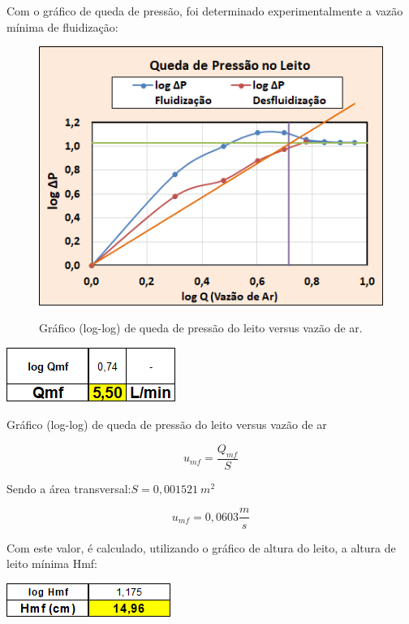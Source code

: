 Com o gráfico de queda de pressão, foi determinado experimentalmente a vazão mínima de fluidização:


\begin{figure}[H]
	\begin{center}
		\includegraphics[scale=1, trim={0 0 0 0}]{figuras/ladeq/fluid/graph3}
		\label{fig7}
		\caption{Gráfico (log-log) de queda de pressão do leito versus vazão de ar.}
	\end{center}
\end{figure}

\includegraphics[scale=.8, trim={0 0 0 0}]{figuras/ladeq/fluid/table1}

Gráfico (log-log) de queda de pressão do leito versus vazão de ar

\begin{equation}\label{key}
u_{m f}=\frac{Q_{m f}}{S}
\end{equation}


Sendo a área transversal:$  S=0,001521 \ m^2 $


\begin{equation}\label{key}
u_{m f}=0,0603 \frac{m}{s}
\end{equation}


Com este valor, é calculado, utilizando o gráfico de altura do leito, a altura de leito mínima Hmf:

\includegraphics[scale=.8, trim={0 0 0 0}]{figuras/ladeq/fluid/table2}

